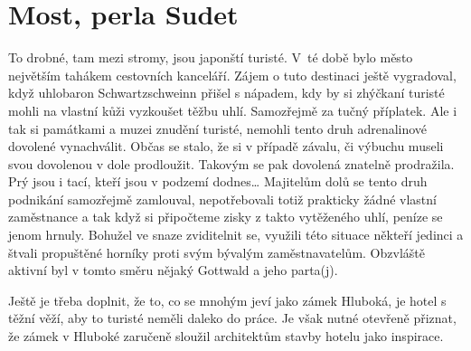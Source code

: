 
\chapter{Most, perla Sudet}

To drobné, tam mezi stromy, jsou japonští turisté. V~té době bylo město
největším tahákem cestovních kanceláří. Zájem o tuto destinaci ještě
vygradoval, když uhlobaron Schwartzschweinn přišel s nápadem, kdy by si
zhýčkaní turisté mohli na vlastní kůži vyzkoušet těžbu uhlí. Samozřejmě za
tučný příplatek. Ale i tak si památkami a muzei znudění turisté, nemohli tento
druh adrenalinové dovolené vynachválit. Občas se stalo, že si v případě závalu,
či výbuchu museli svou dovolenou v dole prodloužit. Takovým se pak dovolená
znatelně prodražila. Prý jsou i tací, kteří jsou v podzemí dodnes… Majitelům
dolů se tento druh podnikání samozřejmě zamlouval, nepotřebovali totiž
prakticky žádné vlastní zaměstnance a tak když si připočteme zisky z takto
vytěženého uhlí, peníze se jenom hrnuly. Bohužel ve snaze zviditelnit se,
využili této situace někteří jedinci a štvali propuštěné horníky proti svým
bývalým zaměstnavatelům. Obzvláště aktivní byl v tomto směru nějaký Gottwald a
jeho parta(j).

Ještě je třeba doplnit, že to, co se mnohým jeví jako zámek Hluboká, je hotel s
těžní věží, aby to turisté neměli daleko do práce. Je však nutné otevřeně
přiznat, že zámek v Hluboké zaručeně sloužil architektům stavby hotelu jako
inspirace.

